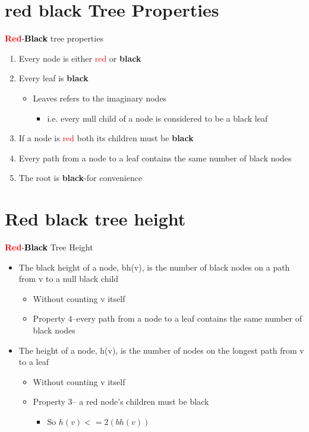 \documentclass{beamer}
\begin{document}
\section*{red black Tree Properties}
\begin{frame}{\textcolor{red} {\textbf{Red}}-\textcolor{black}{\textbf{Black}} tree properties}

\begin{enumerate}
\item  Every node is either \textcolor{red} {red} or\textbf{ black}
\item Every leaf is \textbf{black}
\begin{itemize}
    \item  Leaves refers to the imaginary nodes
    \begin{itemize}
        \item i.e. every null child of a node is considered to be a black leaf
    \end{itemize}
\end{itemize}
\item If a node is \textcolor{red} {red} both its children must be \textbf{black}
\item Every path from a node to a leaf contains the same 
number of black nodes
\item  The root is \textbf{black}-for convenience
\end{enumerate}
    
\end{frame}

\section*{Red black tree height}
\begin{frame}{\textcolor{red} {\textbf{Red}}-\textcolor{black}{\textbf{Black}} Tree Height}
\begin{itemize}
    \item The black height of a node, bh(v), is the number of black 
nodes on a path from v to a null black child
\begin{itemize}
    \item  Without counting v itself
    \item  Property 4–every path from a node to a leaf contains the same 
number of black nodes

\end{itemize}
\item  The height of a node, h(v), is the number of nodes on 
the longest path from v to a leaf
\begin{itemize}
    \item  Without counting v itself
    \item Property 3– a red node’s children must be black
    \begin{itemize}
        \item So $ h(v) <=2(bh(v))$
    \end{itemize}
\end{itemize}
\end{itemize}
    
\end{frame}
\end{document}
